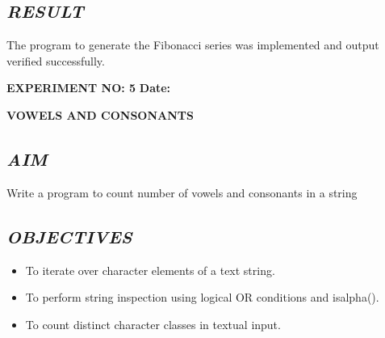 \documentclass[11pt,a4paper]{article}
\begin{document}
\subsection*{\textit{RESULT}}
The program to generate the Fibonacci series was implemented and output verified successfully.

\newpage

\noindent
\textbf{\large EXPERIMENT NO: 5} \hfill \textbf{\large Date: \underline{\hspace{3cm}}}

\vspace{0.2cm}
\begin{center}
{\Huge \textbf{\textcolor{navyblue}{VOWELS AND CONSONANTS}}}
\end{center}
\vspace{0.3cm}

\subsection*{\textit{AIM}}
Write a program to count number of vowels and consonants in a string

\subsection*{\textit{OBJECTIVES}}
\begin{itemize}
  \item To iterate over character elements of a text string.
  \item To perform string inspection using logical OR conditions and isalpha().
  \item To count distinct character classes in textual input.
\end{itemize}
\end{document}
